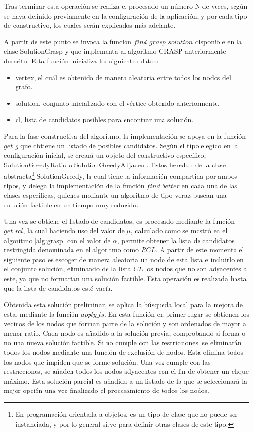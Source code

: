 Tras terminar esta operación se realiza el procesado un número N de veces, según se haya definido previamente en la configuración de la aplicación, y por cada tipo de constructivo, los cuales serán explicados más adelante.

A partir de este punto se invoca la función $find\_grasp\_solution$ disponible en la clase SolutionGrasp y que implementa al algoritmo \gls{GRASP} anteriormente descrito. Esta función inicializa los siguientes datos:
\begin{itemize}
	\item vertex, el cuál es obtenido de manera aleatoria entre todos los nodos del grafo.
	\item solution, conjunto inicializado con el vértice obtenido anteriormente.
	\item cl, lista de candidatos posibles para encontrar una solución.
\end{itemize}

Para la fase constructiva del algoritmo, la implementación se apoya en la función $get\_g$ que obtiene un listado de posibles candidatos. Según el tipo elegido en la configuración inicial, se creará un objeto del constructivo específico, SolutionGreedyRatio o SolutionGreedyAdjacent. Estos heredan de la clase abstracta\footnote{En programación orientada a objetos, es un tipo de clase que no puede ser instanciada, y por lo general sirve para definir otras clases de este tipo.} SolutionGreedy, la cual tiene la información compartida por ambos tipos, y delega la implementación de la función $find\_better$ en cada una de las clases específicas, quienes mediante un algoritmo de tipo voraz buscan una solución factible en un tiempo muy reducido.

Una vez se obtiene el listado de candidatos, es procesado mediante la función $get\_rcl$, la cual haciendo uso del valor de $\mu$, calculado como se mostró en el algoritmo \ref{alg:grasp} con el valor de $\alpha$, permite obtener la lista de candidatos restringida denominada en el algoritmo como $RCL$. A partir de este momento el siguiente paso es escoger de manera aleatoria un nodo de esta lista e incluirlo en el conjunto solución, eliminando de la lista $CL$ los nodos que no son adyacentes a este, ya que no formarían una solución factible. Esta operación es realizada hasta que la lista de candidatos esté vacía.

Obtenida esta solución preliminar, se aplica la búsqueda local para la mejora de esta, mediante la función $apply\_ls$. En esta función en primer lugar se obtienen los vecinos de los nodos que forman parte de la solución y son ordenados de mayor a menor ratio. Cada nodo es añadido a la solución previa, comprobando si forma o no una nueva solución factible. Si no cumple con las restricciones, se eliminarán todos los nodos mediante una función de exclusión de nodos. Esta elimina todos los nodos que impiden que se forme solución. Una vez cumple con las restricciones, se añaden todos los nodos adyacentes con el fin de obtener un clique máximo. Esta solución parcial es añadida a un listado de la que se seleccionará la mejor opción una vez finalizado el procesamiento de todos los nodos.

